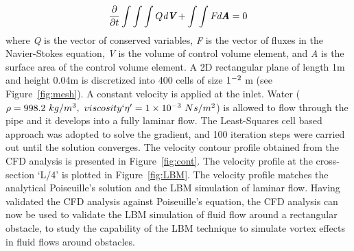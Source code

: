 \begin{align}
\frac{\partial}{\partial t} \int\int\int  Q \textit{d\textbf{V}} + \int\int \textit{F} \textit{d\textbf{A}} = 0
\end{align}
where \textit{Q} is the vector of conserved variables, \textit{F} is the vector of fluxes in the Navier-Stokes equation, \textit{V} is the volume of control volume element, and \textit{A} is the surface area of the control volume element. A 2D rectangular plane of length 1m and height 0.04m is discretized into 400 cells of size $1 \time 10^{-2} $ m (see Figure~\ref{fig:mesh}). A constant velocity is applied at the inlet. Water ($\rho = 998.2\mbox{ }kg/m^{3},\mbox{ } viscosity`\eta'=1 \times 10^{-3}\mbox{ } Ns/m^{2} $) is allowed to flow through the pipe and it develops into a fully laminar flow. The Least-Squares cell based approach was adopted to solve the gradient, and 100 iteration steps were carried out until the solution converges. The velocity contour profile obtained from the CFD analysis is presented in Figure~\ref{fig:cont}. The velocity profile at the cross-section `L/4' is plotted in Figure~\ref{fig:LBM}. The velocity profile matches the analytical Poiseuille's solution and the LBM simulation of laminar flow. Having validated the CFD analysis against Poiseuille's equation, the CFD analysis can now be used to validate the LBM simulation of fluid flow around a rectangular obstacle, to study the capability of the LBM technique to simulate vortex effects in fluid flows around obstacles.

